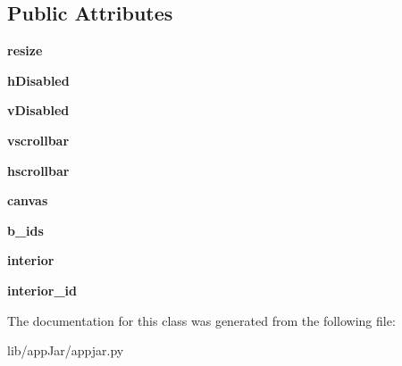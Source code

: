 \subsection*{Public Attributes}
\begin{DoxyCompactItemize}
\item 
\mbox{\label{classappjar_1_1_scroll_pane_ac3d0fa0ad7e90302a404a2c374ab5d17}} 
{\bfseries resize}
\item 
\mbox{\label{classappjar_1_1_scroll_pane_a82b323bb520fa9cb8f4790b7cc28234c}} 
{\bfseries h\+Disabled}
\item 
\mbox{\label{classappjar_1_1_scroll_pane_a67cc3a389e7579a6f296593b9558c2e8}} 
{\bfseries v\+Disabled}
\item 
\mbox{\label{classappjar_1_1_scroll_pane_aae075f3e45265dd722a43b77f66b5b18}} 
{\bfseries vscrollbar}
\item 
\mbox{\label{classappjar_1_1_scroll_pane_af92056eab98f9c1e5be04f6cdd324161}} 
{\bfseries hscrollbar}
\item 
\mbox{\label{classappjar_1_1_scroll_pane_a5c75c0239471da199c914e8c0733f027}} 
{\bfseries canvas}
\item 
\mbox{\label{classappjar_1_1_scroll_pane_ad73d22b8595afcd370c9bc73c7d49c9c}} 
{\bfseries b\+\_\+ids}
\item 
\mbox{\label{classappjar_1_1_scroll_pane_a8e7ae2fab674960fa856a47ea99b4b33}} 
{\bfseries interior}
\item 
\mbox{\label{classappjar_1_1_scroll_pane_ae88c53977c983515c0e8469b06eb2096}} 
{\bfseries interior\+\_\+id}
\end{DoxyCompactItemize}


The documentation for this class was generated from the following file\+:\begin{DoxyCompactItemize}
\item 
lib/app\+Jar/appjar.\+py\end{DoxyCompactItemize}
